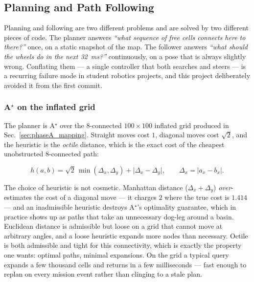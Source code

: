 \subsection{Planning and Path Following}
\label{sec:phaseA_planning}

Planning and following are two different problems and are solved by two
different pieces of code. The planner answers \emph{``what sequence of
free cells connects here to there?''} once, on a static snapshot of the
map. The follower answers \emph{``what should the wheels do in the next
\SI{32}{ms}?''} continuously, on a pose that is always slightly wrong.
Conflating them --- a single controller that both searches and steers ---
is a recurring failure mode in student robotics projects, and this
project deliberately avoided it from the first commit.

\subsubsection{A$^\star$ on the inflated grid}

The planner is A$^\star$ \cite{hart1968astar} over the 8-connected
$100\times100$ inflated grid produced in Sec.~\ref{sec:phaseA_mapping}.
Straight moves cost $1$, diagonal moves cost $\sqrt{2}$, and the
heuristic is the \emph{octile} distance, which is the exact cost of the
cheapest unobstructed 8-connected path:

\begin{equation}
h(a,b) = \sqrt{2}\,\min(\Delta_x,\Delta_y) + \big|\Delta_x - \Delta_y\big|,
\qquad
\Delta_x = |a_x - b_x|.
\label{eq:octile}
\end{equation}

The choice of heuristic is not cosmetic. Manhattan distance
($\Delta_x + \Delta_y$) \emph{over}-estimates the cost of a diagonal
move --- it charges $2$ where the true cost is $1.414$ --- and an
inadmissible heuristic destroys A$^\star$'s optimality guarantee, which
in practice shows up as paths that take an unnecessary dog-leg around a
basin. Euclidean distance is admissible but loose on a grid that cannot
move at arbitrary angles, and a loose heuristic expands more nodes than
necessary. Octile is both admissible and tight for this connectivity,
which is exactly the property one wants: optimal paths, minimal
expansions. On the \phaseA{} grid a typical query expands a few thousand
cells and returns in a few milliseconds --- fast enough to replan on
every mission event rather than clinging to a stale plan.

